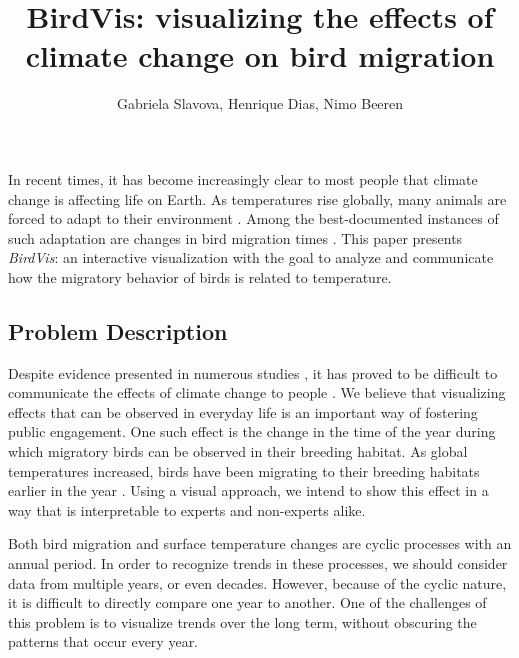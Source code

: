 \documentclass[journal]{vgtc}                %
\title{BirdVis: visualizing the effects of climate change on bird migration}
\author{Gabriela Slavova, Henrique Dias, Nimo Beeren}
\begin{document}


\maketitle

In recent times, it has become increasingly clear to most people that climate change is affecting life on Earth. As temperatures rise globally, many animals are forced to adapt to their environment \cite{parmesan2007pheno,gaughan2009domestic,root2003fingerprints}. Among the best-documented instances of such adaptation are changes in bird migration times \cite{miller2008bird,visser2008climate,jenni2003timing}. This paper presents \emph{BirdVis}: an interactive visualization with the goal to analyze and communicate how the migratory behavior of birds is related to temperature.

\subsection{Problem Description}

Despite evidence presented in numerous studies \cite{solomon2007climate,parry2007climate}, it has proved to be difficult to communicate the effects of climate change to people \cite{lee2015predictors,brulle2012shifting,moser2011communicating}. We believe that visualizing effects that can be observed in everyday life is an important way of fostering public engagement. One such effect is the change in the time of the year during which migratory birds can be observed in their breeding habitat. As global temperatures increased, birds have been migrating to their breeding habitats earlier in the year \cite{cotton2003avian,marra2005influence,jenni2003timing}. Using a visual approach, we intend to show this effect in a way that is interpretable to experts and non-experts alike.

Both bird migration and surface temperature changes are cyclic processes with an annual period. In order to recognize trends in these processes, we should consider data from multiple years, or even decades. However, because of the cyclic nature, it is difficult to directly compare one year to another. One of the challenges of this problem is to visualize trends over the long term, without obscuring the patterns that occur every year.
\end{document}
